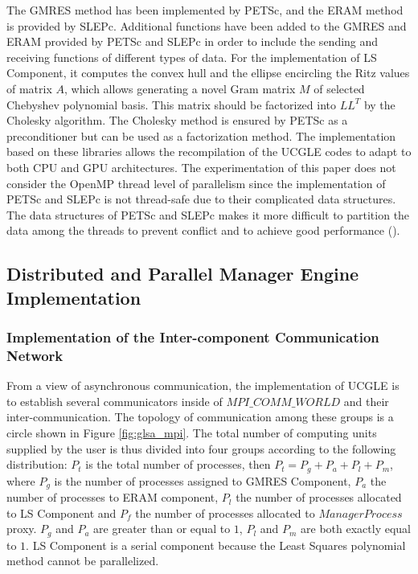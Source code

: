 The GMRES method has been implemented by PETSc, and the ERAM method is provided by SLEPc. Additional functions have been added to the GMRES and ERAM provided by PETSc and SLEPc in order to include the sending and receiving functions of different types of data. For the implementation of LS Component, it computes the convex hull and the ellipse encircling the Ritz values of matrix $A$, which allows generating a novel Gram matrix $M$ of selected Chebyshev polynomial basis. This matrix should be factorized into $LL^T$ by the Cholesky algorithm. The Cholesky method is ensured by PETSc as a preconditioner but can be used as a factorization method. The implementation based on these libraries allows the recompilation of the UCGLE codes to adapt to both CPU and GPU architectures. The experimentation of this paper does not consider the OpenMP thread level of parallelism since the implementation of PETSc and SLEPc is not thread-safe due to their complicated data structures. The data structures of PETSc and SLEPc makes it more difficult to partition the data among the threads to prevent conflict and to achieve good performance (\cite{petsc-user-ref}).


\subsection{Distributed and Parallel Manager Engine Implementation}

\subsubsection{Implementation of the Inter-component Communication Network}

From a view of asynchronous communication, the implementation of UCGLE is to establish several communicators inside of $MPI\_COMM\_WORLD$ and their inter-communication. The topology of communication among these groups is a circle shown in Figure \ref{fig:glsa_mpi}. The total number of computing units supplied by the user is thus divided into four groups according to the following distribution: $P_t$ is the total number of processes, then $P_t = P_g + P_a + P_l + P_m$, where $P_g$ is the number of processes assigned to GMRES Component, $P_a$ the number of processes to ERAM component, $P_l$ the number of processes allocated to LS Component and $P_f$ the number of processes allocated to $Manager Process$ proxy. $P_g$ and $P_a$ are greater than or equal to $1$, $P_l$ and $P_m$ are both exactly equal to $1$. LS Component is a serial component because the Least Squares polynomial method cannot be parallelized.

